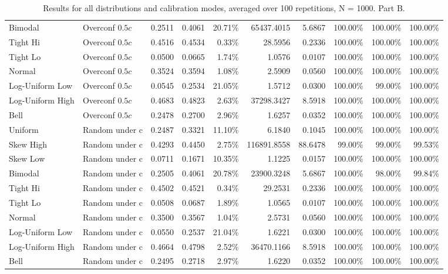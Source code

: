 \documentclass{article}
\theoremstyle{plain}
\theoremstyle{definition}
\theoremstyle{remark}
\begin{document}
\begin{table}[ht]
\begin{tabular}{llrrrrrrrr}
Bimodal & Overconf $0.5c$ & 0.2511 & 0.4061 & 20.71\% & 65437.4015 & 5.6867 & 100.00\% & 100.00\% & 100.00\% \\
Tight Hi & Overconf $0.5c$ & 0.4516 & 0.4534 & 0.33\% & 28.5956 & 0.2336 & 100.00\% & 100.00\% & 100.00\% \\
Tight Lo & Overconf $0.5c$ & 0.0500 & 0.0665 & 1.74\% & 1.0576 & 0.0107 & 100.00\% & 100.00\% & 100.00\% \\
Normal & Overconf $0.5c$ & 0.3524 & 0.3594 & 1.08\% & 2.5909 & 0.0560 & 100.00\% & 100.00\% & 100.00\% \\
Log-Uniform Low & Overconf $0.5c$ & 0.0545 & 0.2534 & 21.05\% & 1.5712 & 0.0300 & 100.00\% & 99.00\% & 100.00\% \\
Log-Uniform High & Overconf $0.5c$ & 0.4683 & 0.4823 & 2.63\% & 37298.3427 & 8.5918 & 100.00\% & 100.00\% & 100.00\% \\
Bell & Overconf $0.5c$ & 0.2478 & 0.2700 & 2.96\% & 1.6257 & 0.0352 & 100.00\% & 100.00\% & 100.00\% \\
Uniform & Random under c & 0.2487 & 0.3321 & 11.10\% & 6.1840 & 0.1045 & 100.00\% & 100.00\% & 100.00\% \\
Skew High & Random under c & 0.4293 & 0.4450 & 2.75\% & 116891.8558 & 88.6478 & 99.00\% & 99.00\% & 99.53\% \\
Skew Low & Random under c & 0.0711 & 0.1671 & 10.35\% & 1.1225 & 0.0157 & 100.00\% & 100.00\% & 100.00\% \\
Bimodal & Random under c & 0.2505 & 0.4061 & 20.78\% & 23900.3248 & 5.6867 & 100.00\% & 98.00\% & 99.84\% \\
Tight Hi & Random under c & 0.4502 & 0.4521 & 0.34\% & 29.2531 & 0.2336 & 100.00\% & 100.00\% & 100.00\% \\
Tight Lo & Random under c & 0.0508 & 0.0687 & 1.89\% & 1.0565 & 0.0107 & 100.00\% & 100.00\% & 100.00\% \\
Normal & Random under c & 0.3500 & 0.3567 & 1.04\% & 2.5731 & 0.0560 & 100.00\% & 100.00\% & 100.00\% \\
Log-Uniform Low & Random under c & 0.0550 & 0.2537 & 21.04\% & 1.6221 & 0.0300 & 100.00\% & 100.00\% & 100.00\% \\
Log-Uniform High & Random under c & 0.4664 & 0.4798 & 2.52\% & 36470.1166 & 8.5918 & 100.00\% & 100.00\% & 100.00\% \\
Bell & Random under c & 0.2495 & 0.2718 & 2.97\% & 1.6220 & 0.0352 & 100.00\% & 100.00\% & 100.00\% \\
\bottomrule
\end{tabular}
\small
\caption{Results for all distributions and calibration modes, averaged over 100 repetitions, N = 1000. Part B. }
\label{tab:report_all_indicators_B}
\end{table}
\end{document}
